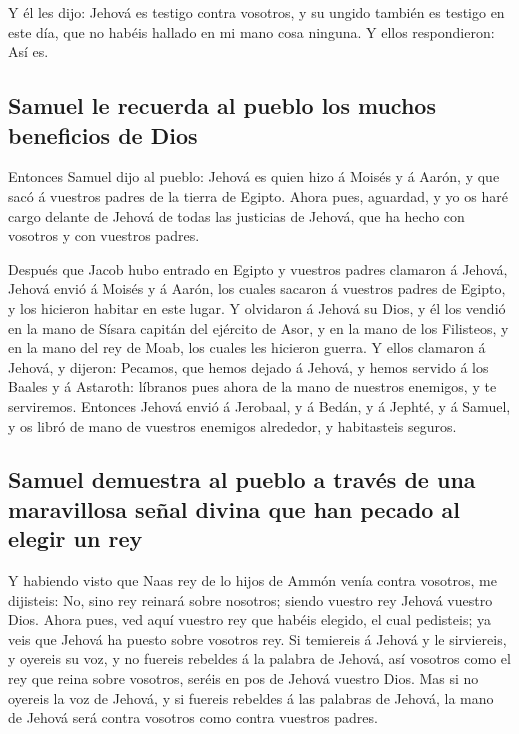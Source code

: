  Y él les dijo: Jehová es testigo contra vosotros, y su
ungido también es testigo en este día, que no habéis hallado en mi mano
cosa ninguna. Y ellos respondieron: Así es.

\hypertarget{samuel-le-recuerda-al-pueblo-los-muchos-beneficios-de-dios}{%
\subsection{Samuel le recuerda al pueblo los muchos beneficios de
Dios}\label{samuel-le-recuerda-al-pueblo-los-muchos-beneficios-de-dios}}

 Entonces Samuel dijo al pueblo: Jehová es quien hizo á
Moisés y á Aarón, y que sacó á vuestros padres de la tierra de Egipto.
 Ahora pues, aguardad, y yo os haré cargo delante de Jehová
de todas las justicias de Jehová, que ha hecho con vosotros y con
vuestros padres.

 Después que Jacob hubo entrado en Egipto y vuestros padres
clamaron á Jehová, Jehová envió á Moisés y á Aarón, los cuales sacaron á
vuestros padres de Egipto, y los hicieron habitar en este lugar.
 Y olvidaron á Jehová su Dios, y él los vendió en la mano de
Sísara capitán del ejército de Asor, y en la mano de los Filisteos, y en
la mano del rey de Moab, los cuales les hicieron guerra.  Y
ellos clamaron á Jehová, y dijeron: Pecamos, que hemos dejado á Jehová,
y hemos servido á los Baales y á Astaroth: líbranos pues ahora de la
mano de nuestros enemigos, y te serviremos.  Entonces
Jehová envió á Jerobaal, y á Bedán, y á Jephté, y á Samuel, y os libró
de mano de vuestros enemigos alrededor, y habitasteis seguros.

\hypertarget{samuel-demuestra-al-pueblo-a-travuxe9s-de-una-maravillosa-seuxf1al-divina-que-han-pecado-al-elegir-un-rey}{%
\subsection{Samuel demuestra al pueblo a través de una maravillosa señal
divina que han pecado al elegir un
rey}\label{samuel-demuestra-al-pueblo-a-travuxe9s-de-una-maravillosa-seuxf1al-divina-que-han-pecado-al-elegir-un-rey}}

 Y habiendo visto que Naas rey de lo hijos de Ammón venía
contra vosotros, me dijisteis: No, sino rey reinará sobre nosotros;
siendo vuestro rey Jehová vuestro Dios.  Ahora pues, ved
aquí vuestro rey que habéis elegido, el cual pedisteis; ya veis que
Jehová ha puesto sobre vosotros rey.  Si temiereis á Jehová
y le sirviereis, y oyereis su voz, y no fuereis rebeldes á la palabra de
Jehová, así vosotros como el rey que reina sobre vosotros, seréis en pos
de Jehová vuestro Dios.  Mas si no oyereis la voz de
Jehová, y si fuereis rebeldes á las palabras de Jehová, la mano de
Jehová será contra vosotros como contra vuestros padres.

